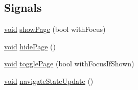\subsection*{\-Signals}
\begin{DoxyCompactItemize}
\item 
\hyperlink{group___u_a_v_objects_plugin_ga444cf2ff3f0ecbe028adce838d373f5c}{void} \hyperlink{group___core_plugin_ga5ddca3c2d6c7c1696aaa9d21a297d75e}{show\-Page} (bool with\-Focus)
\item 
\hyperlink{group___u_a_v_objects_plugin_ga444cf2ff3f0ecbe028adce838d373f5c}{void} \hyperlink{group___core_plugin_gab17c1ab24f6ff4a8e32da73dd6f3a709}{hide\-Page} ()
\item 
\hyperlink{group___u_a_v_objects_plugin_ga444cf2ff3f0ecbe028adce838d373f5c}{void} \hyperlink{group___core_plugin_gaa737406ffca155e80dc1af7ee3ff1cdd}{toggle\-Page} (bool with\-Focus\-If\-Shown)
\item 
\hyperlink{group___u_a_v_objects_plugin_ga444cf2ff3f0ecbe028adce838d373f5c}{void} \hyperlink{group___core_plugin_gad0071aa500a2af9ac99b389a357a3c7f}{navigate\-State\-Update} ()
\end{DoxyCompactItemize}
